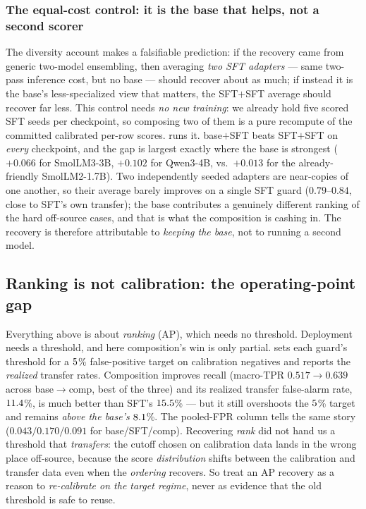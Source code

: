 \subsubsection{The equal-cost control: it is the base that helps, not a second scorer}
\label{sec:actIII-sftsft}

The diversity account makes a falsifiable prediction: if the recovery came from generic two-model
ensembling, then averaging \emph{two SFT adapters} --- same two-pass inference cost, but no base --- should
recover about as much; if instead it is the base's less-specialized view that matters, the SFT$+$SFT
average should recover far less. This control needs \emph{no new training}: we already hold five scored SFT
seeds per checkpoint, so composing two of them is a pure recompute of the committed calibrated per-row
scores.  runs it. base$+$SFT beats SFT$+$SFT on \emph{every} checkpoint, and the gap is
largest exactly where the base is strongest ($+0.066$ for SmolLM3-3B, $+0.102$ for Qwen3-4B, vs.\ $+0.013$
for the already-friendly SmolLM2-1.7B). Two independently seeded adapters are near-copies of one another, so
their average barely improves on a single SFT guard ($0.79$--$0.84$, close to SFT's own transfer); the base
contributes a genuinely different ranking of the hard off-source cases, and that is what the composition is
cashing in. The recovery is therefore attributable to \emph{keeping the base}, not to running a second model.



\subsection{Ranking is not calibration: the operating-point gap}
\label{sec:actIII-operating}

Everything above is about \emph{ranking} (AP), which needs no threshold. Deployment needs a
threshold, and here composition's win is only partial.  sets each guard's
threshold for a $5$\% false-positive target on calibration negatives and reports
the \emph{realized} transfer rates. Composition improves recall (macro-TPR $0.517\!\to\!0.639$
across base$\to$comp, best of the three) and its realized transfer false-alarm rate,
$11.4$\%, is much better than SFT's $15.5$\% --- but
it still overshoots the $5$\% target and remains \emph{above the base's}
$8.1$\%. The pooled-FPR column tells the same story ($0.043/0.170/0.091$ for
base/SFT/comp). Recovering \emph{rank} did not hand us a threshold that \emph{transfers}: the
cutoff chosen on calibration data lands in the wrong place off-source, because the score
\emph{distribution} shifts between the calibration and transfer data even when the \emph{ordering}
recovers. So treat an AP recovery as a reason to \emph{re-calibrate on the target regime}, never as
evidence that the old threshold is safe to reuse.

